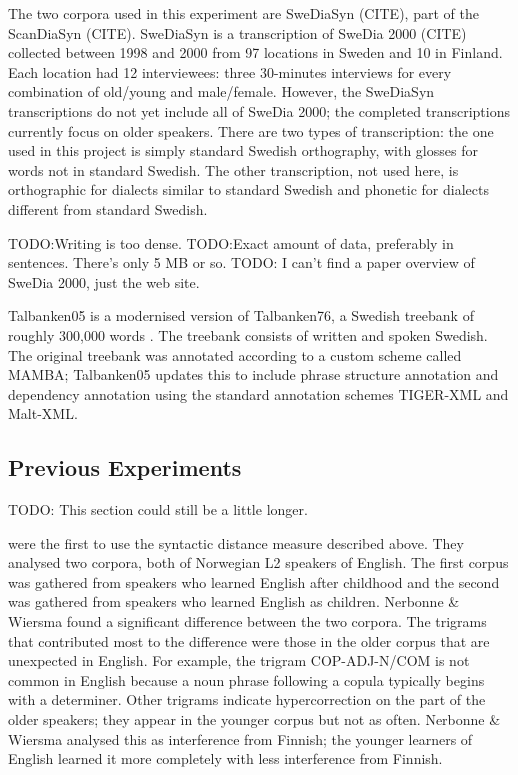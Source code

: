 \documentclass[11pt]{article}
\begin{document}
The two corpora used in this experiment are SweDiaSyn (CITE), part of
the ScanDiaSyn (CITE). SweDiaSyn is a transcription of SweDia 2000
(CITE) collected between 1998 and 2000 from 97 locations in Sweden and
10 in Finland. Each location had 12 interviewees: three 30-minutes
interviews for every combination of old/young and male/female.
However, the SweDiaSyn transcriptions do not yet include all of SweDia
2000; the completed transcriptions currently focus on older
speakers. There are two types of transcription: the one used in this
project is simply standard Swedish orthography, with glosses for words
not in standard Swedish. The other transcription, not used here, is
orthographic for dialects similar to standard Swedish and phonetic for
dialects different from standard Swedish.

TODO:Writing is too dense.
TODO:Exact amount of data, preferably in sentences. There's only 5 MB
or so.
TODO: I can't find a paper overview of SweDia 2000, just the web site.

Talbanken05 is a modernised version of Talbanken76, a Swedish treebank of
roughly 300,000 words \cite{nivre06}. The treebank consists of written
and spoken Swedish. The original treebank was annotated according to a
custom scheme called MAMBA; Talbanken05 updates this to include phrase
structure annotation and dependency annotation using the standard
annotation schemes TIGER-XML and Malt-XML.

\subsection{Previous Experiments}

TODO: This section could still be a little longer.

 were the first to use the syntactic distance
measure described above. They analysed two corpora, both of Norwegian
L2 speakers of English. The first corpus was gathered from speakers
who learned English after childhood and the second was gathered from
speakers who learned English as children. Nerbonne \& Wiersma found a
significant difference between the two corpora. The trigrams that
contributed most to the difference were those in the older corpus that
are unexpected in English. For example, the trigram COP-ADJ-N/COM is
not common in English because a noun phrase following a copula
typically begins with a determiner. Other trigrams indicate
hypercorrection on the part of the older speakers; they appear in the
younger corpus but not as often. Nerbonne \& Wiersma analysed this as
interference from Finnish; the younger learners of English learned it
more completely with less interference from Finnish.
\end{document}
